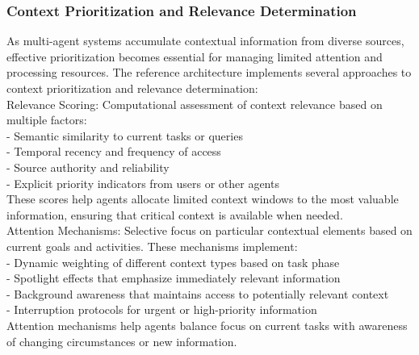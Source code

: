 \subsubsection{Context Prioritization and Relevance Determination}
As multi-agent systems accumulate contextual information from diverse sources, effective prioritization becomes essential for managing limited attention and processing resources. The reference architecture implements several approaches to context prioritization and relevance determination:\\ \newline
Relevance Scoring: Computational assessment of context relevance based on multiple factors:\\ \newline
- Semantic similarity to current tasks or queries\\ \newline
- Temporal recency and frequency of access\\ \newline
- Source authority and reliability\\ \newline
- Explicit priority indicators from users or other agents\\ \newline
These scores help agents allocate limited context windows to the most valuable information, ensuring that critical context is available when needed.\\ \newline
Attention Mechanisms: Selective focus on particular contextual elements based on current goals and activities. These mechanisms implement:\\ \newline
- Dynamic weighting of different context types based on task phase\\ \newline
- Spotlight effects that emphasize immediately relevant information\\ \newline
- Background awareness that maintains access to potentially relevant context\\ \newline
- Interruption protocols for urgent or high-priority information\\ \newline
Attention mechanisms help agents balance focus on current tasks with awareness of changing circumstances or new information.\\ \newline

